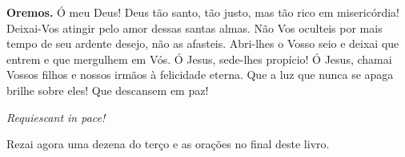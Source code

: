 \vspace{\baselineskip}\noindent \textbf{Oremos.} Ó meu Deus! Deus tão santo, tão justo, mas tão rico em misericórdia! Deixai-Vos atingir pelo amor dessas santas almas. Não Vos oculteis por mais tempo de seu ardente desejo, não as afasteis. Abri-lhes o Vosso seio e deixai que entrem e que mergulhem em Vós. Ó Jesus, sede-lhes propício! Ó Jesus, chamai Vossos filhos e nossos irmãos à felicidade eterna. Que a luz que nunca se apaga brilhe sobre eles! Que descansem em paz!



\begin{center}
\textit{Requiescant in pace!}
\end{center}

Rezai agora uma dezena do terço e as orações no final deste livro.

